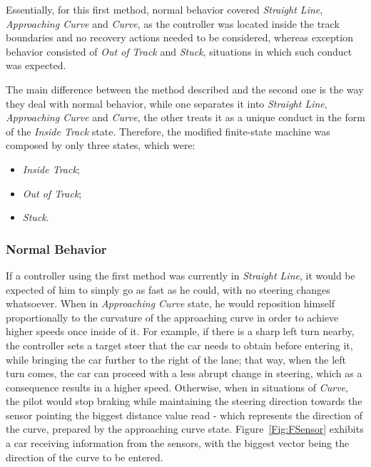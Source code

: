 	Essentially, for this first method, normal behavior covered \emph{Straight Line}, \emph{Approaching Curve} and \emph{Curve}, as the controller was located inside the track boundaries and no recovery actions needed to be considered, whereas exception behavior consisted of \emph{Out of Track} and \emph{Stuck}, situations in which such conduct was expected.
	
	The main difference between the method described and the second one is the way they deal with normal behavior, while one separates it into \emph{Straight Line}, \emph{Approaching Curve} and \emph{Curve}, the other treats it as a unique conduct in the form of the \emph{Inside Track} state. Therefore, the modified finite-state machine was composed by only three states, which were:
	
	\begin{itemize}
		
		\item \emph{Inside Track};
		
		\item \emph{Out of Track};
		
		\item \emph{Stuck}.
		
	\end{itemize}
	
\subsubsection{Normal Behavior}
	
	If a controller using the first method was currently in \emph{Straight Line}, it would be expected of him to simply go as fast as he could, with no steering changes whatsoever. When in \emph{Approaching Curve} state, he would reposition himself proportionally to the curvature of the approaching curve in order to achieve higher speeds once inside of it. For example, if there is a sharp left turn nearby, the controller sets a target steer that the car needs to obtain before entering it, while bringing the car further to the right of the lane; that way, when the left turn comes, the car can proceed with a less abrupt change in steering, which as a consequence results in a higher speed. Otherwise, when in situations of \emph{Curve}, the pilot would stop braking while maintaining the steering direction towards the sensor pointing the biggest distance value read - which represents the direction of the curve, prepared by the approaching curve state. Figure~\ref{Fig:FSensor} exhibits a car receiving information from the sensors, with the biggest vector being the direction of the curve to be entered.
	
